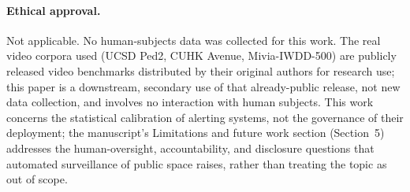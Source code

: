 \documentclass[11pt,a4paper]{article}
\begin{document}
\paragraph{Ethical approval.} Not applicable. No human-subjects data was
collected for this work. The real video corpora used (UCSD Ped2, CUHK Avenue, Mivia-IWDD-500)
are publicly released video benchmarks
distributed by their original authors for research use; this paper is a
downstream, secondary use of that already-public release, not new data
collection, and involves no interaction with human subjects. This work
concerns the statistical calibration of alerting systems, not the governance
of their deployment; the manuscript's Limitations and future work section (Section~5) addresses the human-oversight, accountability, and disclosure questions
that automated surveillance of public space raises, rather than treating the
topic as out of scope.
\end{document}
